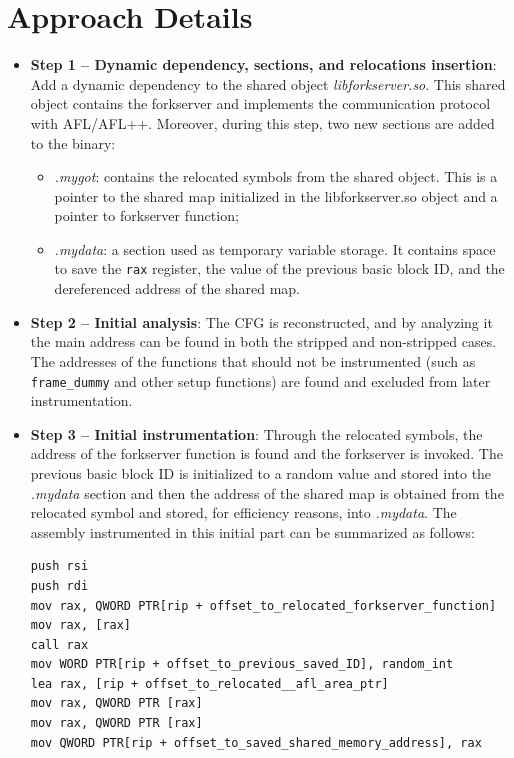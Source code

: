 \documentclass{report}
\begin{document}
            \section{Approach Details}
                \begin{itemize}
                    \item \textbf{Step 1 -- Dynamic dependency, sections, and relocations insertion}: Add a dynamic dependency to the shared object \textit{libforkserver.so}.
                                This shared object contains the forkserver and implements the communication protocol with AFL/AFL++.
                                Moreover, during this step, two new sections are added to the binary:
                                \begin{itemize}
                                    \item \textit{.mygot}: contains the relocated symbols from the shared object. This is a pointer to the shared map initialized in the libforkserver.so object and a pointer to forkserver function;
                                    \item \textit{.mydata}: a section used as temporary variable storage. It contains space to save the \texttt{rax} register, the value of the previous basic block ID, and the dereferenced address of the shared map.
                                \end{itemize}
                    \item \textbf{Step 2 -- Initial analysis}: The CFG is reconstructed, and by analyzing it the main address
                                    can be found in both the stripped and non-stripped cases.
                                    The addresses of the functions that should not be instrumented (such as \texttt{frame\_dummy} and other setup functions) are found and excluded from later instrumentation.
                    \item \textbf{Step 3 -- Initial instrumentation}: Through the relocated symbols, the address of the forkserver function is found and the forkserver is invoked. 
                                    The previous basic block ID is initialized to a random value and stored into the \textit{.mydata} section 
                                    and then the address of the shared map is obtained from the relocated symbol and stored, for efficiency reasons, into \textit{.mydata}.
                                    The assembly instrumented in this initial part can be summarized as follows:
                                    \begin{lstlisting}[style=customasm, caption={Initial Instrumentation Code}, label=Initial Instrumentation Code]
push rsi
push rdi
mov rax, QWORD PTR[rip + offset_to_relocated_forkserver_function]
mov rax, [rax]
call rax
mov WORD PTR[rip + offset_to_previous_saved_ID], random_int
lea rax, [rip + offset_to_relocated__afl_area_ptr]
mov rax, QWORD PTR [rax]
mov rax, QWORD PTR [rax]
mov QWORD PTR[rip + offset_to_saved_shared_memory_address], rax
                                    \end{lstlisting}
                

\end{itemize}
\end{document}
